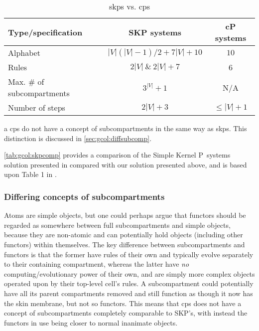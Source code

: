\begin{table}
\begin{threeparttable}
\centering
\caption{\acrlong{skps} vs. \gls{cps}}
\label{tab:gcol:skpcomp}
\begin{tabular}{@{}lcc@{}}
\toprule
Type/specification                & SKP systems        & cP systems \\ \midrule
Alphabet                          & \(|V|(|V|-1)/2 + 7|V| + 10\) & \(10\)         \\
Rules                             & \(2|V|~\&~2|V| + 7\)       & 6          \\
Max. \# of subcompartments & \(3^|V| + 1\)             & N/A\tnote{a}          \\
Number of steps                   & \(2|V| + 3\)             & \(\leq |V| + 1\)         \\ \bottomrule
\end{tabular}%
\begin{tablenotes}
\item[a] \gls{cps} do not have a concept of subcompartments in the same way as \gls{skps}.  This distinction is discussed in \autoref{sec:gcol:diffsubcomp}.
\end{tablenotes}
\end{threeparttable}
\end{table}


\autoref{tab:gcol:skpcomp} provides a comparison of the Simple Kernel P~systems solution presented in \cite{Gheorghe2013} compared with our solution presented above, and is based upon Table 1 in \cite{Gheorghe2013}.  

\subsubsection{\label{sec:gcol:diffsubcomp}Differing concepts of subcompartments}
Atoms are simple objects, but one could perhaps argue that functors should be regarded as somewhere between full subcompartments and simple objects, because they are non-atomic and can potentially hold objects (including other functors) within themselves.  The key difference between subcompartments and functors is that the former have rules of their own and typically evolve separately to their containing compartment, whereas the latter have \emph{no} computing/evolutionary power of their own, and are simply more complex objects operated upon by their top-level cell's rules.  A subcompartment could potentially have all its parent compartments removed and still function as though it now has the skin membrane, but not so functors.  This means that \gls{cps} does not have a concept of subcompartments completely comparable to SKP's, with instead the functors in use being closer to normal inanimate objects.

